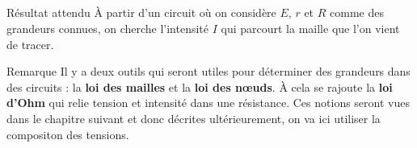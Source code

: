 \documentclass[../main/main.tex]{subfiles}
\begin{document}
\subsection{}
\begin{tcbraster}[raster columns=5, raster equal height=rows]
    \begin{NCprop}[raster multicolumn=2]{Résultat attendu}
        À partir d'un circuit où on considère $E$, $r$ et $R$ comme des
        grandeurs connues, on cherche l'intensité $I$ qui parcourt la maille que
        l'on vient de tracer.
    \end{NCprop}
    \begin{NCrema}[raster multicolumn=3]{Remarque}
        Il y a deux outils qui seront utiles pour déterminer des grandeurs dans
        des circuits : la \textbf{loi des mailles} et la \textbf{loi des nœuds}.
        À cela se rajoute la \textbf{loi d'Ohm} qui relie tension et intensité
        dans une résistance. Ces notions seront vues dans le chapitre suivant et
        donc décrites ultérieurement, on va ici utiliser la compositon des
        tensions.
    \end{NCrema}
\end{tcbraster}
\end{document}
